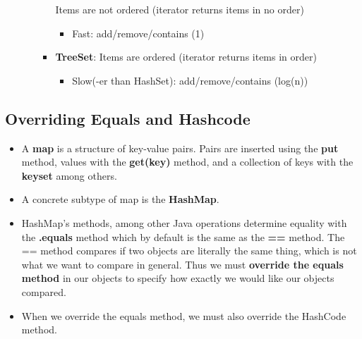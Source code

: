\documentclass[letterpaper] {article}
\begin{document}
\begin{itemize}
\begin{itemize}
\begin{itemize}
                             Items are not ordered (iterator returns items in no order)
                             \begin{itemize}
                                 \item Fast: add/remove/contains (1)
                             \end{itemize}
                         \item \textbf{TreeSet}:
                             Items are ordered (iterator returns items in order)
                             \begin{itemize}
                                 \item Slow(-er than HashSet): add/remove/contains (log(n))
                             \end{itemize}
                     \end{itemize}
            \end{itemize}
    \end{itemize}

    \subsection{Overriding Equals and Hashcode}
    \begin{itemize}
        \item A \textbf{map} is a structure of key-value pairs. Pairs are inserted using the \textbf{put} method, values with the \textbf{get(key)} method, and a collection of keys with the \textbf{keyset} among others.
        \item A concrete subtype of map is the \textbf{HashMap}.
        \item HashMap's methods, among other Java operations determine equality with the \textbf{.equals} method which by default is the same as the \textbf{==} method. The == method compares if two objects are literally the same thing, which is not what we want to compare in general. Thus we must \textbf{override the equals method} in our objects to specify how exactly we would like our objects compared. 
        \item When we override the equals method, we must also override the HashCode method. 
    \end{itemize}
\end{document}
